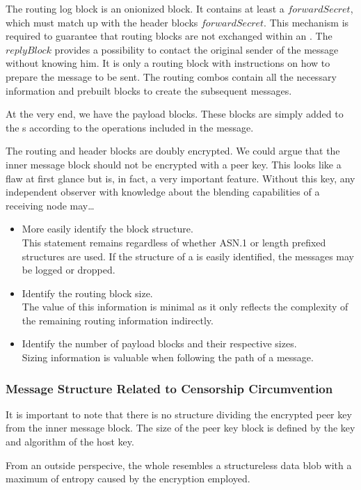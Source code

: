 The routing log block is an onionized block. It contains at least a $forwardSecret$, which must match up with the header blocks $forwardSecret$. This mechanism is required to guarantee that routing blocks are not exchanged within an . The $replyBlock$ provides a possibility to contact the original sender of the message without knowing him. It is only a routing block with instructions on how to prepare the message to be sent. The routing combos contain all the necessary information and prebuilt blocks to create the subsequent messages.

At the very end, we have the payload blocks. These blocks are simply added to the s  according to the operations included in the message.

The routing and header blocks are doubly encrypted. We could argue that the inner message block should not be encrypted with a peer key. This looks like a flaw at first glance but is, in fact, a very important feature. Without this key, any independent observer with knowledge about the blending capabilities of a receiving node may\ldots
\begin{itemize}
	\item More easily identify the block structure.\\ 
	This statement remains regardless of whether ASN.1 or length prefixed structures are used. If the structure of a \VortexMessage{} is easily identified, the messages may be logged or dropped.
	\item Identify the routing block size.\\
	The value of this information is minimal as it only reflects the complexity of the remaining routing information indirectly.
	\item Identify the number of payload blocks and their respective sizes. \\
	Sizing information is valuable when following the path of a message.
\end{itemize}

\subsubsection{Message Structure Related to Censorship Circumvention}
It is important to note that there is no structure dividing the encrypted peer key from the inner message block. The size of the peer key block is defined by the key and algorithm of the host key. 

From an outside perspecive, the whole \VortexMessage{} resembles a structureless data blob with a maximum of entropy caused by the encryption employed. 

